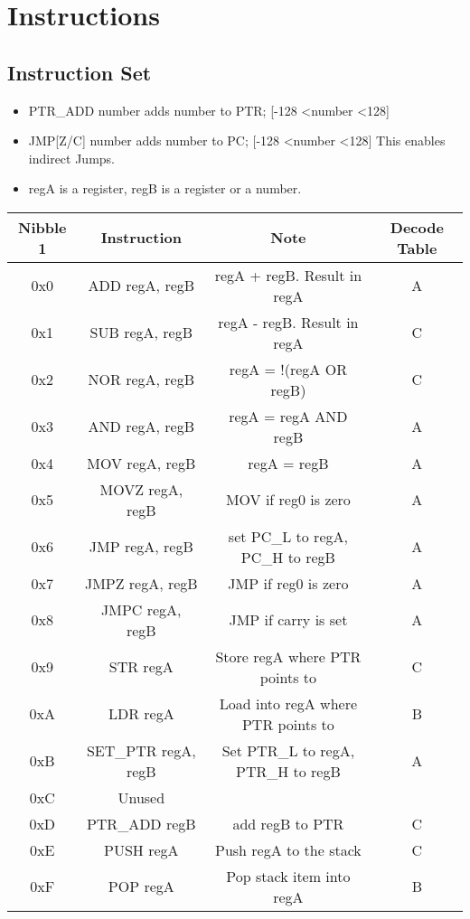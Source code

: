\documentclass[a4paper, 12pt]{article}
\begin{document}
	\newpage
	\section{Instructions}
	\subsection{Instruction Set}
	\small\begin{center}	
		\begin{itemize}
			\item PTR\_ADD number adds number to PTR; [-128 \textless \space number \textless 128]
			\item JMP[Z/C] number adds number to PC; [-128 \textless \space number \textless 128]
				This enables indirect Jumps.			
			\item regA is a register, regB is a register or a number.\newline

		\end{itemize}
		\begin{tabular}{|c|c|c|c|}
			\hline
			Nibble 1 & Instruction & Note & Decode Table\\ \hline
			0x0 & ADD regA, regB & regA + regB. Result in regA & A\\ \hline
			0x1 & SUB regA, regB & regA - regB. Result in regA & C \\ \hline
			0x2 & NOR regA, regB & regA = !(regA OR regB) & C \\ \hline
			0x3 & AND regA, regB & regA = regA AND regB & A\\ \hline
			0x4 & MOV regA, regB & regA = regB & A\\ \hline
			0x5 & MOVZ regA, regB & MOV if reg0 is zero &  A\\ \hline
			0x6 & JMP regA, regB & set PC\_L to regA, PC\_H to regB & A\\ \hline
			0x7 & JMPZ regA, regB & JMP if reg0 is zero & A\\ \hline
			0x8 & JMPC regA, regB & JMP if carry is set & A\\ \hline
			0x9 & STR regA & Store regA where PTR points to & C\\ \hline
			0xA & LDR regA & Load into regA where PTR points to & B\\ \hline
			0xB & SET\_PTR regA, regB & Set PTR\_L to regA, PTR\_H to regB & A\\ \hline
			0xC & Unused & &  \\ \hline
			0xD & PTR\_ADD regB & add regB to PTR & C\\ \hline
			0xE & PUSH regA & Push regA to the stack & C\\ \hline
			0xF & POP regA & Pop stack item into regA & B\\	\hline
		\end{tabular}

	\end{center}
	\newpage
\end{document}
